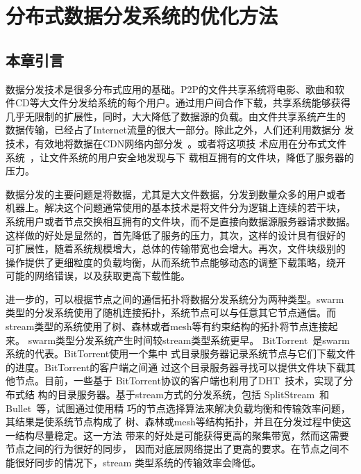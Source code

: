 \chapter{分布式数据分发系统的优化方法}
\label{chap:bt}

\section{本章引言}


数据分发技术是很多分布式应用的基础。P2P的文件共享系统将电影、歌曲和软
件CD等大文件分发给系统的每个用户。通过用户间合作下载，共享系统能够获得
几乎无限制的扩展性，同时，大大降低了数据源的负载。由文件共享系统产生的
数据传输，已经占了Internet流量的很大一部分。除此之外，人们还利用数据分
发技术，有效地将数据在CDN网络内部分发~\cite{fastreplica}。或者将这项技
术应用在分布式文件系统~\cite{sharkfs}，让文件系统的用户安全地发现与下
载相互拥有的文件块，降低了服务器的压力。

数据分发的主要问题是将数据，尤其是大文件数据，分发到数量众多的用户或者
机器上。解决这个问题通常使用的基本技术是将文件分为逻辑上连续的若干块，
系统用户或者节点交换相互拥有的文件块，而不是直接向数据源服务器请求数据。
这样做的好处是显然的，首先降低了服务的压力，其次，这样的设计具有很好的
可扩展性，随着系统规模增大，总体的传输带宽也会增大。再次，文件块级别的
操作提供了更细粒度的负载均衡，从而系统节点能够动态的调整下载策略，绕开
可能的网络错误，以及获取更高下载性能。

进一步的，可以根据节点之间的通信拓扑将数据分发系统分为两种类型。swarm
类型的分发系统使用了随机连接拓扑，系统节点可以与任意其它节点通信。而
stream类型的系统使用了树、森林或者mesh等有约束结构的拓扑将节点连接起来。
swarm类型分发系统产生时间较stream类型系统更早。
BitTorrent~\cite{bittorrent}是swarm系统的代表。BitTorrent使用一个集中
式目录服务器记录系统节点与它们下载文件的进度。BitTorrent的客户端之间通
过这个目录服务器寻找可以提供文件块下载其他节点。目前，一些基于
BitTorrent协议的客户端也利用了DHT~\cite{kademlia}技术，实现了分布式结
构的目录服务器。基于stream方式的分发系统，包括
SplitStream~\cite{splitstream}和Bullet~\cite{bullet}等，试图通过使用精
巧的节点选择算法来解决负载均衡和传输效率问题，其结果是使系统节点构成了
树、森林或mesh等结构拓扑，并且在分发过程中使这一结构尽量稳定。这一方法
带来的好处是可能获得更高的聚集带宽，然而这需要节点之间的行为很好的同步，
因而对底层网络提出了更高的要求。在节点之间不能很好同步的情况下，stream
类型系统的传输效率会降低。

